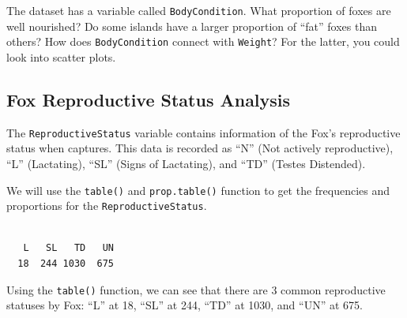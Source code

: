\documentclass[
  letterpaper,
]{report}
\newenvironment{Shaded}{\begin{snugshade}}{\end{snugshade}}
\newcommand{\CommentTok}[1]{\textcolor[rgb]{0.37,0.37,0.37}{#1}}
\newcommand{\FunctionTok}[1]{\textcolor[rgb]{0.28,0.35,0.67}{#1}}
\newcommand{\NormalTok}[1]{\textcolor[rgb]{0.00,0.23,0.31}{#1}}
\newcommand{\OtherTok}[1]{\textcolor[rgb]{0.00,0.23,0.31}{#1}}
\newcommand{\SpecialCharTok}[1]{\textcolor[rgb]{0.37,0.37,0.37}{#1}}
\begin{document}
\begin{tcolorbox}[enhanced jigsaw, titlerule=0mm, breakable, bottomrule=.15mm, colframe=quarto-callout-warning-color-frame, opacityback=0, colback=white, rightrule=.15mm, toprule=.15mm, opacitybacktitle=0.6, bottomtitle=1mm, colbacktitle=quarto-callout-warning-color!10!white, title={Body Condition}, toptitle=1mm, arc=.35mm, left=2mm, leftrule=.75mm, coltitle=black]

The dataset has a variable called \texttt{BodyCondition}. What
proportion of foxes are well nourished? Do some islands have a larger
proportion of ``fat'' foxes than others? How does \texttt{BodyCondition}
connect with \texttt{Weight}? For the latter, you could look into
scatter plots.

\end{tcolorbox}

\subsection{Fox Reproductive Status Analysis}\label{fox-rs}

The \texttt{ReproductiveStatus} variable contains information of the
Fox's reproductive status when captures. This data is recorded as ``N''
(Not actively reproductive), ``L'' (Lactating), ``SL'' (Signs of
Lactating), and ``TD'' (Testes Distended).

We will use the \texttt{table()} and \texttt{prop.table()} function to
get the frequencies and proportions for the \texttt{ReproductiveStatus}.

\begin{Shaded}
\end{Shaded}

\begin{verbatim}

   L   SL   TD   UN 
  18  244 1030  675 
\end{verbatim}

Using the \texttt{table()} function, we can see that there are 3 common
reproductive statuses by Fox: ``L'' at 18, ``SL'' at 244, ``TD'' at
1030, and ``UN'' at 675.
\end{document}
